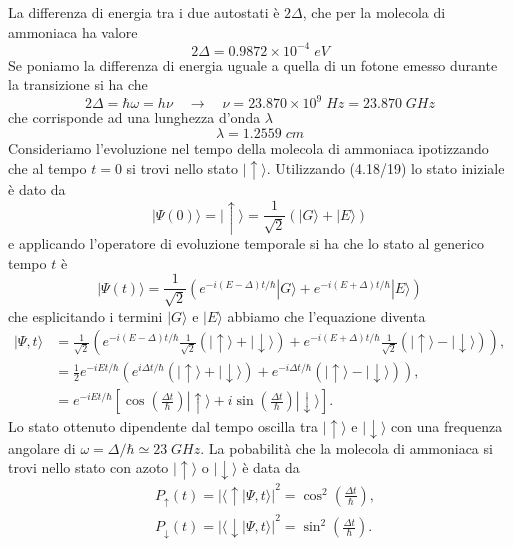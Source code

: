 La differenza di energia tra i due autostati \`e $2 \Delta$, che per la molecola di ammoniaca ha valore
\begin{equation*}
	2 \Delta = 0.9872 \times 10^{-4} \;eV
\end{equation*} 
Se poniamo la differenza di energia uguale a quella di un fotone emesso durante la transizione si ha che 
\begin{equation*}
	2 \Delta = \hbar \omega = h \nu \quad \rightarrow \quad \nu = 23.870 \times 10^9 \; Hz =23.870 \;GHz
\end{equation*}
che corrisponde ad una lunghezza d'onda $\lambda$ 
\begin{equation*}
	\lambda = 1.2559 \;cm
\end{equation*}
Consideriamo l'evoluzione nel tempo della molecola di ammoniaca ipotizzando che al tempo $t = 0$ si trovi nello stato $|\uparrow \rangle$.  Utilizzando (4.18/19) lo stato iniziale \`e dato da 
\begin{equation*}
	|\Psi(0) \rangle = |\uparrow \rangle = \frac{1}{\sqrt{2}}(|G \rangle + |E \rangle)
\end{equation*}
e applicando l'operatore di evoluzione temporale si ha che lo stato al generico tempo $t$ \`e 
\begin{equation*}
	|\Psi(t) \rangle = \frac{1}{\sqrt{2}}(e^{-i(E-\Delta)t/\hbar}|G \rangle + e^{-i(E+\Delta)t/\hbar}|E \rangle )
\end{equation*}
che esplicitando i termini $|G \rangle$ e $|E \rangle $ abbiamo che l'equazione diventa 
\begin{equation*}
	\begin{aligned}
|\Psi, t\rangle & =\frac{1}{\sqrt{2}}\left(e^{-i(E-\Delta) t / \hbar} \frac{1}{\sqrt{2}}(|\uparrow\rangle+|\downarrow\rangle)+e^{-i(E+\Delta) t / \hbar} \frac{1}{\sqrt{2}}(|\uparrow\rangle-|\downarrow\rangle)\right), \\[0.5cm]
& =\frac{1}{2} e^{-i E t / \hbar}\left(e^{i \Delta t / \hbar}(|\uparrow\rangle+|\downarrow\rangle)+e^{-i \Delta t / \hbar}(|\uparrow\rangle-|\downarrow\rangle)\right), \\[0.5cm]
& =e^{-i E t / \hbar}\left[\cos \left(\frac{\Delta t}{\hbar}\right)|\uparrow\rangle+i \sin \left(\frac{\Delta t}{\hbar}\right)|\downarrow\rangle\right] .
\end{aligned}
\end{equation*}
Lo stato ottenuto dipendente dal tempo oscilla tra $|\uparrow \rangle$ e $|\downarrow \rangle $ con una frequenza angolare di $\omega = \Delta / \hbar \simeq 23  \;GHz$. La pobabilit\`a che la molecola di ammoniaca si trovi nello stato con azoto $| \uparrow \rangle $ o $|\downarrow \rangle $ \`e data da 
\begin{equation*}
	\begin{aligned}
& P_{\uparrow}(t)=|\langle\uparrow \mid \Psi, t\rangle|^2=\cos ^2\left(\frac{\Delta t}{\hbar}\right), \\[0.5cm]
& P_{\downarrow}(t)=|\langle\downarrow \mid \Psi, t\rangle|^2=\sin ^2\left(\frac{\Delta t}{\hbar}\right) .
\end{aligned}
\end{equation*}
\newpage
 
